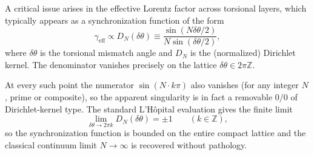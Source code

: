 \documentclass[a4paper]{article}
\begin{document}
A critical issue arises in the effective Lorentz factor across torsional layers, which typically appears as a synchronization function of the form
\[
\gamma_{\text{eff}} \propto D_N(\delta\theta) \equiv \frac{\sin(N \delta\theta / 2)}{N \sin(\delta\theta / 2)},
\]
where $\delta\theta$ is the torsional mismatch angle and $D_N$ is the (normalized) Dirichlet kernel. The denominator vanishes precisely on the lattice $\delta\theta \in 2\pi \mathbb{Z}$.

At every such point the numerator $\sin(N \cdot k\pi)$ also vanishes (for any integer $N$, prime or composite), so the apparent singularity is in fact a removable $0/0$ of Dirichlet-kernel type. The standard L'H\^{o}pital evaluation gives the finite limit
\[
\lim_{\delta\theta \to 2\pi k} D_N(\delta\theta) = \pm 1 \qquad (k \in \mathbb{Z}),
\]
so the synchronization function is bounded on the entire compact lattice and the classical continuum limit $N \to \infty$ is recovered without pathology.
\end{document}
